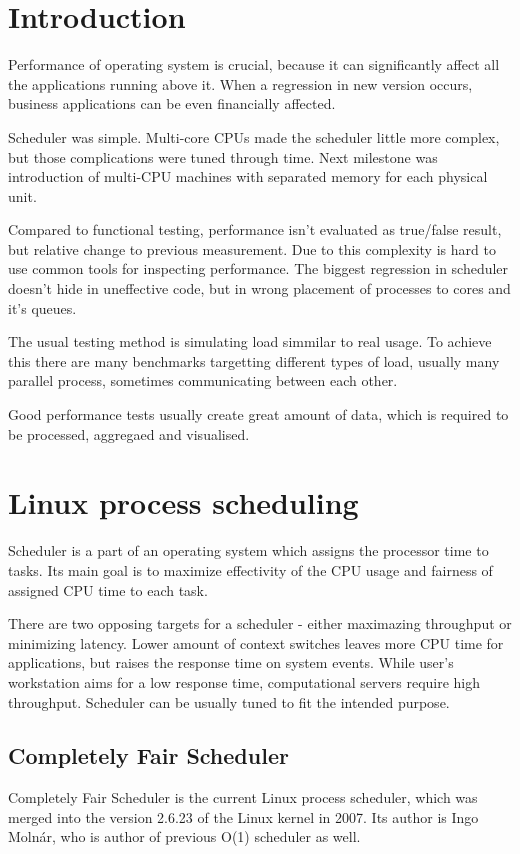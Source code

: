 \chapter{Introduction}
Performance of operating system is crucial, because it can significantly affect all the applications running above it.
When a regression in new version occurs, business applications can be even financially affected.

Scheduler was simple. Multi-core CPUs made the scheduler little more complex, but those complications were tuned through time.
Next milestone was introduction of multi-CPU machines with separated memory for each physical unit.

Compared to functional testing, performance isn't evaluated as true/false result, but relative change to previous measurement.
Due to this complexity is hard to use common tools for inspecting performance.
The biggest regression in scheduler doesn't hide in uneffective code, but in wrong placement of processes to cores and it's queues.

The usual testing method is simulating load simmilar to real usage.
To achieve this there are many benchmarks targetting different types of load, usually many parallel process, sometimes communicating between each other.

Good performance tests usually create great amount of data, which is required to be processed, aggregaed and visualised.

\chapter{Linux process scheduling}
Scheduler is a part of an operating system which assigns the processor time to tasks.
Its main goal is to maximize effectivity of the CPU usage and fairness of assigned
CPU time to each task.

There are two opposing targets for a scheduler - either maximazing throughput or
minimizing latency. Lower amount of context switches leaves more CPU time for
applications, but raises the response time on system events.
While user's workstation aims for a low response time, computational servers
require high throughput. Scheduler can be usually tuned to fit the intended
purpose.

\section{Completely Fair Scheduler}
Completely Fair Scheduler is the current Linux process scheduler, which was
merged into the version
2.6.23 of the Linux kernel in 2007. Its author is Ingo Molnár, who is author of previous
O(1) scheduler as well.

